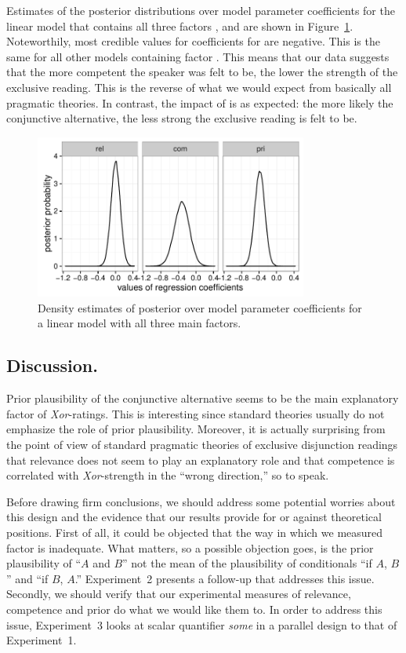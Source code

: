 \documentclass[12pt]{article}
\begin{document}
Estimates of the posterior distributions over model parameter coefficients for the linear model
that contains all three factors \rel, \com and \pri are shown in
Figure~\ref{fig:densityMCMC}. Noteworthily, most credible values for coefficients for \com are
negative. This is the same for all other models containing factor \com. This means that our
data suggests that the more competent the speaker was felt to be, the lower the strength of the
exclusive reading. This is the reverse of what we would expect from basically all pragmatic
theories. In contrast, the impact of \pri is as expected: the more likely the conjunctive
alternative, the less strong the exclusive reading is felt to be.

\begin{figure}
  \centering
  \includegraphics[width=0.8\textwidth]{pics/densityMCMCExp1.pdf}
  \caption{Density estimates of posterior over model parameter coefficients for a linear model
    with all three main factors.}
  \label{fig:densityMCMC}
\end{figure}

\subsection*{Discussion.} Prior plausibility of the conjunctive alternative seems to be the
main explanatory factor of \emph{Xor}-ratings. This is interesting since standard theories
usually do not emphasize the role of prior plausibility. Moreover, it is actually surprising
from the point of view of standard pragmatic theories of exclusive disjunction readings that
relevance does not seem to play an explanatory role and that competence is correlated with
\emph{Xor}-strength in the ``wrong direction,'' so to speak. 

Before drawing firm conclusions, we should address some potential worries about this design and
the evidence that our results provide for or against theoretical positions. First of all, it
could be objected that the way in which we measured factor \pri is inadequate. What matters, so
a possible objection goes, is the prior plausibility of ``$A$ and $B$'' not the mean of the
plausibility of conditionals ``if $A$, $B$'' and ``if $B$, $A$.'' Experiment~2 presents a
follow-up that addresses this issue. Secondly, we should verify that our experimental measures
of relevance, competence and prior do what we would like them to. In order to address this
issue, Experiment~3 looks at scalar quantifier \emph{some} in a parallel design to that of
Experiment~1.
\end{document}

